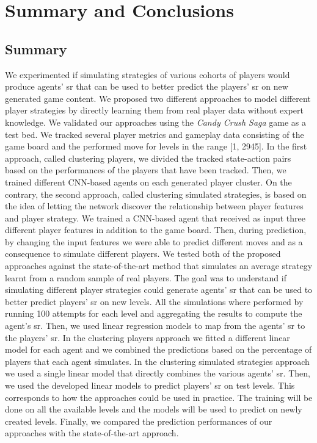 \chapter{Summary and Conclusions}
\label{chap:conclusions}
\section{Summary}
We experimented if simulating strategies of various cohorts of players would produce agents' \acs{sr} that can be used to better predict the players' \acs{sr} on new generated game content. We proposed two different approaches to model different player strategies by directly learning them from real player data without expert knowledge. We validated our approaches using the \textit{Candy Crush Saga} game as a test bed. We tracked several player metrics and gameplay data consisting of the game board and the performed move for levels in the range [1, 2945]. In the first approach, called clustering players, we divided the tracked state-action pairs based on the performances of the players that have been tracked. Then, we trained different \acs{CNN}-based agents on each generated player cluster. On the contrary, the second approach, called clustering simulated strategies, is based on the idea of letting the network discover the relationship between player features and player strategy. We trained a \acs{CNN}-based agent that received as input three different player features in addition to the game board. Then, during prediction, by changing the input features we were able to predict different moves and as a consequence to simulate different players. We tested both of the proposed approaches against the state-of-the-art method that simulates an average strategy learnt from a random sample of real players. The goal was to understand if simulating different player strategies could generate agents' \acs{sr} that can be used to better predict players' \acs{sr} on new levels. All the simulations where performed by running 100 attempts for each level and aggregating the results to compute the agent's \acs{sr}. Then, we used linear regression models to map from the agents' \acs{sr} to the players' \acs{sr}. In the clustering players approach we fitted a different linear model for each agent and we combined the predictions based on the percentage of players that each agent simulates. In the clustering simulated strategies approach we used a single linear model that directly combines the various agents' \acs{sr}. Then, we used the developed linear models to predict players' \acs{sr} on test levels. This corresponds to how the approaches could be used in practice. The training will be done on all the available levels and the models will be used to predict on newly created levels. Finally, we compared the prediction performances of our approaches with the state-of-the-art approach. 
